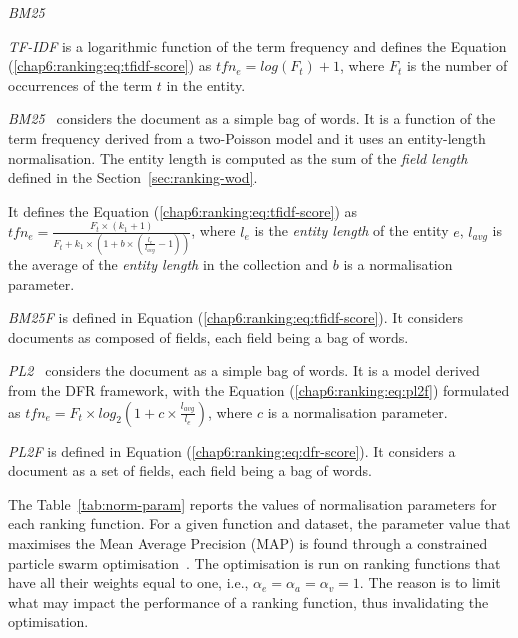 \begin{labeling}{\emph{BM25~\cite{robertson:1994:sigir}}}
  \item[\emph{TF-IDF}] is a logarithmic function of the term frequency and defines the Equation (\ref{chap6:ranking:eq:tfidf-score}) as
  $
  tfn_e=log(F_t)+1
  $,
  where $F_t$ is the number of occurrences of the term $t$ in the entity.
  \item[\emph{BM25~\cite{robertson:1994:sigir}}] considers the document as a simple bag of words. It is a function of the term frequency derived from a two-Poisson model and it uses an entity-length normalisation. The entity length is computed as the sum of the \emph{field length} defined in the Section~\ref{sec:ranking-wod}.

  It defines the Equation (\ref{chap6:ranking:eq:tfidf-score}) as
  $
  tfn_e=\frac{F_t\times(k_1+1)}{F_t+k_1\times \left(1+b\times\left(\frac{l_e}{l_{avg}}-1\right)\right)}
  $,
where $l_e$ is the \emph{entity length} of the entity $e$, $l_{avg}$ is the average of the \emph{entity length} in the collection and $b$ is a normalisation parameter.
  \item[\emph{BM25F}] is defined in Equation (\ref{chap6:ranking:eq:tfidf-score}). It considers documents as composed of fields, each field being a bag of words.
  \item[\emph{PL2~\cite{amati:2002:acm}}] considers the document as a simple bag of words. It is a model derived from the DFR framework, with the Equation (\ref{chap6:ranking:eq:pl2f}) formulated as
  $
  tfn_e=F_t\times log_2\left(1+c\times\frac{l_{avg}}{l_e}\right)
  $,
  where $c$ is a normalisation parameter.
  \item[\emph{PL2F}] is defined in Equation (\ref{chap6:ranking:eq:dfr-score}). It considers a document as a set of fields, each field being a bag of words.
\end{labeling}

The Table~\ref{tab:norm-param} reports the values of normalisation parameters for each ranking function. For a given function and dataset, the parameter value that maximises the Mean Average Precision (MAP) is found through a constrained particle swarm optimisation~\cite{xiaohui:2002:sci}. The optimisation is run on ranking functions that have all their weights equal to one, i.e., $\alpha_e = \alpha_a = \alpha_v = 1$. The reason is to limit what may impact the performance of a ranking function, thus invalidating the optimisation.\\

